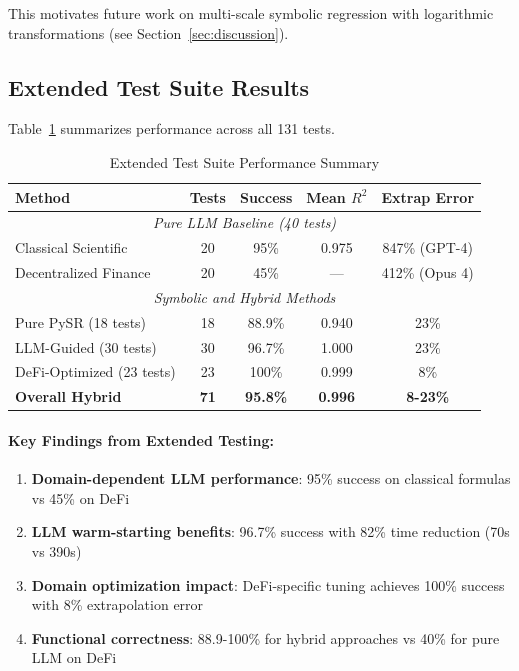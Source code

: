 This motivates future work on multi-scale symbolic regression with logarithmic transformations (see Section~\ref{sec:discussion}).

\subsection{Extended Test Suite Results}

Table~\ref{tab:extended_results} summarizes performance across all 131 tests.

\begin{table}[htbp]
\centering
\caption{Extended Test Suite Performance Summary}
\label{tab:extended_results}
\begin{tabular}{@{}lcccc@{}}
\toprule
\textbf{Method} & \textbf{Tests} & \textbf{Success} & \textbf{Mean $R^2$} & \textbf{Extrap Error} \\
\midrule
\multicolumn{5}{c}{\textit{Pure LLM Baseline (40 tests)}} \\
\midrule
Classical Scientific & 20 & 95\% & 0.975 & 847\% (GPT-4) \\
Decentralized Finance & 20 & 45\% & --- & 412\% (Opus 4) \\
\midrule
\multicolumn{5}{c}{\textit{Symbolic and Hybrid Methods}} \\
\midrule
Pure PySR (18 tests) & 18 & 88.9\% & 0.940 & 23\% \\
LLM-Guided (30 tests) & 30 & 96.7\% & 1.000 & 23\% \\
DeFi-Optimized (23 tests) & 23 & 100\% & 0.999 & 8\% \\
\midrule
\textbf{Overall Hybrid} & \textbf{71} & \textbf{95.8\%} & \textbf{0.996} & \textbf{8-23\%} \\
\bottomrule
\end{tabular}
\end{table}

\paragraph{Key Findings from Extended Testing:}
\begin{enumerate}
\item \textbf{Domain-dependent LLM performance}: 95\% success on classical formulas vs 45\% on DeFi
\item \textbf{LLM warm-starting benefits}: 96.7\% success with 82\% time reduction (70s vs 390s)
\item \textbf{Domain optimization impact}: DeFi-specific tuning achieves 100\% success with 8\% extrapolation error
\item \textbf{Functional correctness}: 88.9-100\% for hybrid approaches vs 40\% for pure LLM on DeFi
\end{enumerate}

